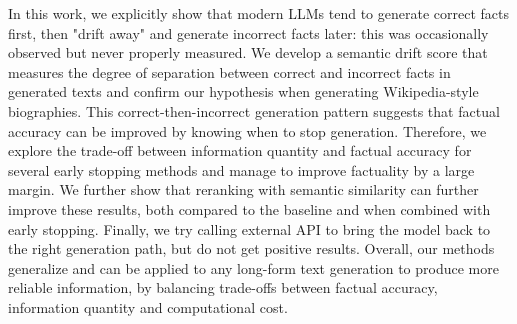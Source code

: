 In this work, we explicitly show that modern LLMs tend to generate correct facts first, then "drift away" and generate incorrect facts later: this was occasionally observed but never properly measured. We develop a semantic drift score that measures the degree of separation between correct and incorrect facts in generated texts and confirm our hypothesis when generating Wikipedia-style biographies. This correct-then-incorrect generation pattern suggests that factual accuracy can be improved by knowing when to stop generation. Therefore, we explore the trade-off between information quantity and factual accuracy for several early stopping methods and manage to improve factuality by a large margin. We further show that reranking with semantic similarity can further improve these results, both compared to the baseline and when combined with early stopping. Finally, we try calling external API to bring the model back to the right generation path, but do not get positive results. Overall, our methods generalize and can be applied to any long-form text generation to produce more reliable information, by balancing trade-offs between factual accuracy, information quantity and computational cost.